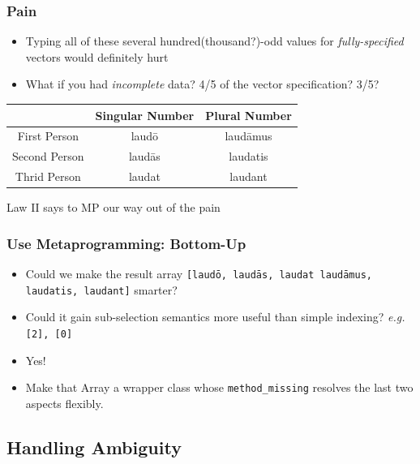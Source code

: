 \documentclass[slidestop,compress,mathserif]{beamer}
\begin{document}
\begin{frame}
		\frametitle{Pain}
		\begin{itemize}
			\item Typing all of these several hundred(thousand?)-odd values for \emph{fully-specified} vectors would definitely hurt
			\pause
			\item What if you had \emph{incomplete} data?  4/5 of the vector specification?  3/5?
		\end{itemize}
		\begin{center}
			\begin{tabular}{|c|c|c|}
				\hline
				  & Singular Number &  Plural Number\\
				\hline
				First Person  & laud\={o}  & laud\={a}mus\\
				Second Person & laud\={a}s & laudatis \\
				Thrid Person  & laudat     & laudant \\
				\hline
			\end{tabular}
		\end{center}
		\pause
		Law II says to MP our way out of the pain
\end{frame}


\begin{frame}
	\frametitle{ Use Metaprogramming:  Bottom-Up}
	\begin{itemize}
		\item Could we make the result array \texttt{[laud\={o}, laud\={a}s, laudat laud\={a}mus, laudatis, laudant]} smarter?
		\pause
		\item Could it gain sub-selection semantics more useful than simple indexing?  \emph{e.g.} \texttt{[2], [0]}
		\item Yes!
		\pause 
		\item Make that Array a wrapper class whose \texttt{method\_missing} resolves the last two aspects flexibly.
	\end{itemize}
\end{frame}


\subsection{Handling Ambiguity} %
\label{sub:methods}
\end{document}
